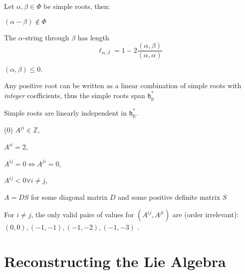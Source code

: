 \documentclass[11pt,final]{article}
\begin{document}
\begin{prop}\label{prop:SimpleRootProps}
Let $\alpha, \beta \in \Phi$ be simple roots, then:
\begin{ronumerate}
\item $(\alpha - \beta) \notin \Phi$
\item The $\alpha$-string through $\beta$ has length
\begin{equation}
\ell_{\alpha,\beta} = 1 - 2\frac{(\alpha,\beta)}{(\alpha,\alpha)}
\end{equation}
\item $(\alpha,\beta) \leq 0.$
\item Any positive root can be written as a linear combination of simple roots with \textit{integer} coefficients, thus the simple roots span $\mathfrak{h}^*_\mathbb{R}$
\end{ronumerate}
\end{prop}

\begin{prop}
Simple roots are linearly independent in $\mathfrak{h}^*_{\mathbb{R}}$.
\end{prop}

\begin{prop}\label{prop:CartanConstraints}
\begin{ronumerate}
\item[(0)] $A^{ji} \in \mathbb{Z}$,
\item $A^{ii} = 2$,
\item $A^{ij} = 0 \Leftrightarrow A^{ji} = 0$,
\item $A^{ij} < 0 \forall i \neq j$,
\item $A = DS$ for some diagonal matrix $D$ and some positive definite matrix $S$
\end{ronumerate}
\end{prop}

\begin{prop}
For $i\neq j$, the only valid pairs of values for $(A^{ij},A^{ji})$ are (order irrelevant): $(0,0), (-1,-1), (-1,-2), (-1,-3)$ .
\end{prop}

\section{Reconstructing the Lie Algebra}
\end{document}
